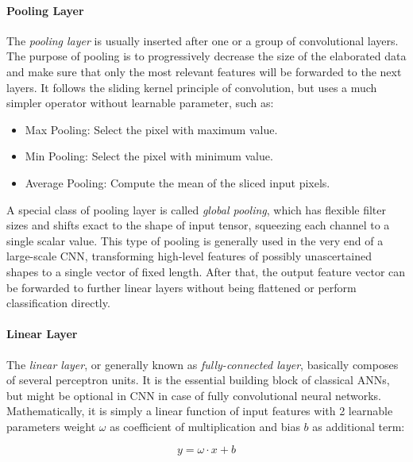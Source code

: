         \paragraph{Pooling Layer}
            The \textit{pooling layer} is usually inserted after one or a group of convolutional layers.
            The purpose of pooling is to progressively decrease the size of the elaborated data and make sure that only the most relevant features will be forwarded to the next layers.
            It follows the sliding kernel principle of convolution, but uses a much simpler operator without learnable parameter, such as:

            \begin{itemize}
                \item Max Pooling: Select the pixel with maximum value.
                \item Min Pooling: Select the pixel with minimum value.
                \item Average Pooling: Compute the mean of the sliced input pixels.
            \end{itemize}

            A special class of pooling layer is called \textit{global pooling}, which has flexible filter sizes and shifts exact to the shape of input tensor, squeezing each channel to a single scalar value.
            This type of pooling is generally used in the very end of a large-scale CNN, transforming high-level features of possibly unascertained shapes to a single vector of fixed length.
            After that, the output feature vector can be forwarded to further linear layers without being flattened or perform classification directly.

        \paragraph{Linear Layer}
            The \textit{linear layer}, or generally known as \textit{fully-connected layer}, basically composes of several perceptron units.
            It is the essential building block of classical ANNs, but might be optional in CNN in case of fully convolutional neural networks.
            Mathematically, it is simply a linear function of input features with 2 learnable parameters weight $\omega$ as coefficient of multiplication and bias $b$ as additional term:

            \begin{equation}
                y = \omega \cdot x + b
            \end{equation}

